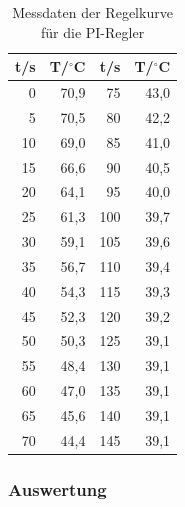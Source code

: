 \documentclass[12pt,a4paper]{article}
\begin{document}
\begin{table}[htbp]
\centering
\begin{tabular}{r|rr|r}

t/s & T/$^\circ$C & t/s & T/$^\circ$C \\ \hline
0 & 70,9 & 75 & 43,0 \\ 
5 & 70,5 & 80 & 42,2 \\ 
10 & 69,0 & 85 & 41,0 \\ 
15 & 66,6 & 90 & 40,5 \\ 
20 & 64,1 & 95 & 40,0 \\ 
25 & 61,3 & 100 & 39,7 \\ 
30 & 59,1 & 105 & 39,6 \\ 
35 & 56,7 & 110 & 39,4 \\ 
40 & 54,3 & 115 & 39,3 \\ 
45 & 52,3 & 120 & 39,2 \\ 
50 & 50,3 & 125 & 39,1 \\ 
55 & 48,4 & 130 & 39,1 \\ 
60 & 47,0 & 135 & 39,1 \\ 
65 & 45,6 & 140 & 39,1 \\ 
70 & 44,4 & 145 & 39,1 \\ 
\end{tabular}
\caption{Messdaten der Regelkurve für die PI-Regler}
\label{tab:3_4}
\end{table}



\subsubsection*{Auswertung}
\end{document}
